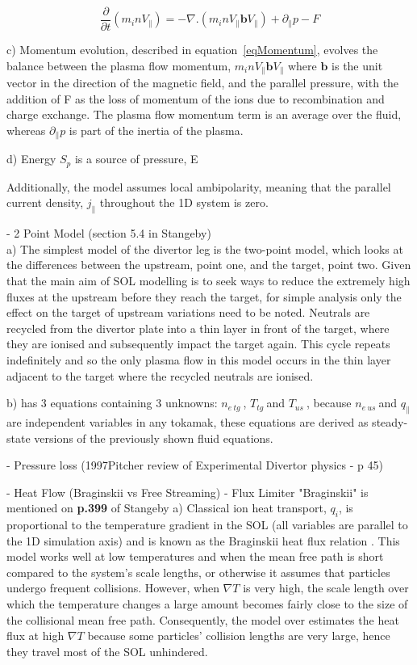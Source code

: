 \documentclass[11pt]{article}  %
\providecommand{\neus}{$n_{e~us}~$} %
\providecommand{\netg}{$n_{e~tg}~$} %
\providecommand{\Tus}{$T_{us}~$} %
\providecommand{\Ttg}{$T_{tg}~$} %
\newcommand{\citep}[1]{\cite{#1}}
\begin{document}
\begin{equation}\label{eqMomentum}
\frac{\partial}{\partial t}(m_i n V_{\parallel}) = -\nabla . (m_i n V_{\parallel} \textbf{b} V_{\parallel}) + \partial_{\parallel}p - F
\end{equation}

c) Momentum evolution, described in equation~\ref{eqMomentum}, evolves the balance between the plasma flow momentum, $m_inV_{\parallel}\textbf{b}V_{\parallel}$ where $\textbf{b}$ is the unit vector in the direction of the magnetic field, and the parallel pressure, with the addition of F as the loss of momentum of the ions due to recombination and charge exchange. The plasma flow momentum term is an average over the fluid, whereas $\partial_{\parallel}p$ is part of the inertia of the plasma.

d) Energy 
$S_p$ is a source of pressure, E


Additionally, the model assumes local ambipolarity, meaning that the parallel current density, $j_{\parallel}$ throughout the 1D system is zero. 

- 2 Point Model (section 5.4 in Stangeby)\\
a) The simplest model of the divertor leg is the two-point model, which looks at the differences between the upstream, point one, and the target, point two. Given that the main aim of SOL modelling is to seek ways to reduce the extremely high fluxes at the upstream before they reach the target, for simple analysis only the effect on the target of upstream variations need to be noted. Neutrals are recycled from the divertor plate into a thin layer in front of the target, where they are ionised and subsequently impact the target again. This cycle repeats indefinitely and so the only plasma flow in this model occurs in the thin layer adjacent to the target where the recycled neutrals are ionised.

b) has 3 equations containing 3 unknowns: \netg, \Ttg and \Tus, because \neus and $q_{\parallel}$ are independent variables in any tokamak, these equations are derived as steady-state versions of the previously shown fluid equations.


- Pressure loss (1997Pitcher review of Experimental Divertor physics - p 45)

- Heat Flow (Braginskii vs Free Streaming) - Flux Limiter
"Braginskii" is mentioned on \textbf{p.399} of Stangeby
a) Classical ion heat transport, $q_i$, is proportional to the temperature gradient in the SOL (all variables are parallel to the 1D simulation axis) and is known as the Braginskii heat flux relation \citep{Braginskii1965}. This model works well at low temperatures and when the mean free path is short compared to the system's scale lengths, or otherwise it assumes that particles undergo frequent collisions. However, when $\nabla T$ is very high, the scale length over which the temperature changes a large amount becomes fairly close to the size of the collisional mean free path. Consequently, the model over estimates the heat flux at high $\nabla T$ because some particles' collision lengths are very large, hence they travel most of the SOL unhindered.
\end{document}
